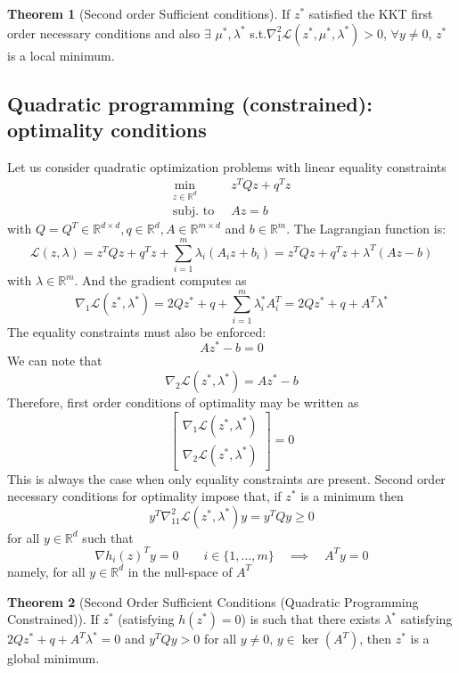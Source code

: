 \documentclass[openany]{book}
\newcommand{\R}{\mathbb{R}}               %
\theoremstyle{definition}
\newtheorem{theorem}{Theorem}[section]
\theoremstyle{remark}
\begin{document}
\begin{theorem}[Second order Sufficient conditions]
If $z^*$ satisfied the KKT first order necessary conditions and also $\exists$ $\mu^*,\lambda^*$ s.t.$\nabla_1^2\mathcal{L}(z^*,\mu^*,\lambda^*) > 0$, $\forall y\not=0$, $z^*$ is a local minimum.
\end{theorem}

\subsection{Quadratic programming (constrained): optimality conditions}

Let us consider quadratic optimization problems with linear equality constraints 
\begin{align*}
    \min_{z\in\R^d}\ & z^TQz+q^Tz \\
    \text{subj. to }\ & Az=b
\end{align*}
with $Q=Q^T\in\R^{d\times d}, q\in\R^d, A\in\R^{m\times d}$ and $b\in\R^m$.
The Lagrangian function is:
\[
    \mathcal{L}(z,\lambda) = z^TQz + q^Tz +\displaystyle\sum_{i=1}^{m}\lambda_i(A_iz+b_i) =  z^TQz + q^Tz + \lambda^T(Az-b)
\]
with $\lambda\in\R^m$. And the gradient computes as 
\[
    \nabla_1 \mathcal{L}(z^*,\lambda^*) = 2Qz^* + q + \displaystyle\sum_{i=1}^{m}\lambda_i^*A_i^T =  2Qz^* + q + A^T\lambda^*
\]
The equality constraints must also be enforced: 
\[
    Az^*-b = 0
\]
We can note that 
\[
    \nabla_2\mathcal{L}(z^*,\lambda^*) = Az^*-b
\]
Therefore, first order conditions of optimality may be written as 
\[
    \begin{bmatrix}
        \nabla_1\mathcal{L}(z^*,\lambda^*)\\ \nabla_2\mathcal{L}(z^*,\lambda^*)
    \end{bmatrix} = 0
\]
This is always the case when only equality constraints are present. Second order necessary conditions for optimality impose that, if $z^*$ is a minimum then 
\[
    y^T\nabla^2_{11}\mathcal{L}(z^*,\lambda^*)y = y^TQy \geq 0
\]
for all $y\in\R^d$ such that 
\[
    \nabla h_i(z)^T y = 0 \qquad i\in\{1,\dots,m\} \quad \implies \quad A^Ty = 0
\]
namely, for all $y\in\R^d$ in the null-space of $A^T$

\begin{theorem}[Second Order Sufficient Conditions (Quadratic Programming Constrained)]
If $z^*$ (satisfying $h(z^*)=0$) is such that there exists $\lambda^*$ satisfying $2Qz^* + q + A^T\lambda^* = 0$ and $y^T Q y > 0$ for all $y \neq 0$, $y \in \ker(A^T)$, then $z^*$ is a global minimum.
\end{theorem}
\end{document}
